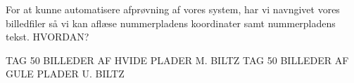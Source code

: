 For at kunne automatisere afprøvning af vores system, har vi navngivet vores billedfiler så vi kan aflæse nummerpladens koordinater samt nummerpladens tekst. HVORDAN?

TAG 50 BILLEDER AF HVIDE PLADER M. BILTZ
TAG 50 BILLEDER AF GULE PLADER U. BILTZ

